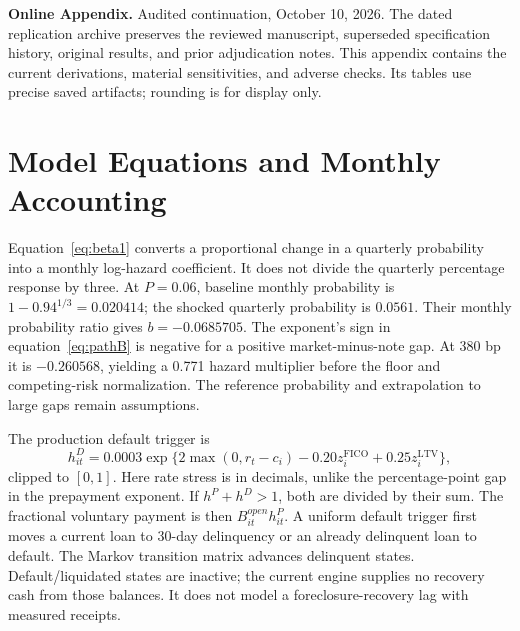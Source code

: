 \noindent\textbf{Online Appendix.} Audited continuation, October 10, 2026. The dated replication archive preserves the reviewed manuscript, superseded specification history, original results, and prior adjudication notes. This appendix contains the current derivations, material sensitivities, and adverse checks. Its tables use precise saved artifacts; rounding is for display only.

\section{Model Equations and Monthly Accounting}\label{app:model}

Equation~\eqref{eq:beta1} converts a proportional change in a quarterly probability into a monthly log-hazard coefficient. It does not divide the quarterly percentage response by three. At $P=0.06$, baseline monthly probability is $1-0.94^{1/3}=0.020414$; the shocked quarterly probability is $0.0561$. Their monthly probability ratio gives $b=-0.0685705$. The exponent's sign in equation~\eqref{eq:pathB} is negative for a positive market-minus-note gap. At 380 bp it is $-0.260568$, yielding a 0.771 hazard multiplier before the floor and competing-risk normalization. The reference probability and extrapolation to large gaps remain assumptions.

The production default trigger is
\begin{equation}
h^D_{it}=0.0003\exp\{2\max(0,r_t-c_i)-0.20z_i^{\mathrm{FICO}}+0.25z_i^{\mathrm{LTV}}\},
\label{eq:default}
\end{equation}
clipped to $[0,1]$. Here rate stress is in decimals, unlike the percentage-point gap in the prepayment exponent. If $h^P+h^D>1$, both are divided by their sum. The fractional voluntary payment is then $B_{it}^{open}h^P_{it}$. A uniform default trigger first moves a current loan to 30-day delinquency or an already delinquent loan to default. The Markov transition matrix advances delinquent states. Default/liquidated states are inactive; the current engine supplies no recovery cash from those balances. It does not model a foreclosure-recovery lag with measured receipts.

